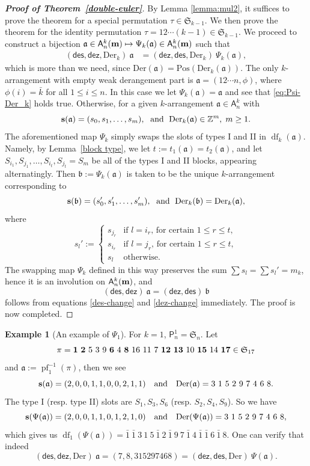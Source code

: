 \documentclass[12pt]{amsart}
\numberwithin{equation}{section}
\theoremstyle{plain}
\theoremstyle{definition}
\newtheorem{example}[theorem]{Example}
\newcommand{\Z}{\mathbb{Z}}
\newcommand\A{\mathsf{A}}
\renewcommand\P{\mathsf{P}}
\def\dez{\mathsf{dez}}
\def\Der{\mathrm{Der}}
\def\Pos{\mathrm{Pos}}
\def\des{\mathsf{des}}
\def\S{\mathfrak{S}}
\def\a{\mathfrak{a}}
\def\b{\mathfrak{b}}
\def\s{\operatorname{{\bf s}}}
\def\df{\operatorname{df}}
\def\pf{\operatorname{pf}}
\def\s{\operatorname{{\bf s}}}
\def\neg#1{{{{\bar#1}}}}
\begin{document}
\begin{proof}[\bf Proof of Theorem~\ref{double-euler}]
By Lemma \ref{lemma:mul2}, it suffices to prove the theorem for a special permutation $\tau\in\S_{k-1}$. We then prove the theorem for the identity permutation $\tau=12\cdots (k-1)\in \S_{k-1}$. We proceed to construct a bijection $\a\in\A_n^k({\bf m})\mapsto \Psi_k(\a)\in\A_n^k({\bf m})$ such that
\begin{align}\label{eq:Psi-Der_k}
(\des,\dez,\Der_k)~\a &= (\dez,\des,\Der_k)~\Psi_k(\a),
\end{align}
which is more than we need, since $\Der(\a)=\Pos(\Der_k(\a))$.
The only $k$-arrangement with empty weak derangement part is $\a=(12\cdots n,\phi)$, where $\phi(i)=\neg k$ for all $1\le i\le n$. In this case we let $\Psi_k(\a)=\a$ and see that \eqref{eq:Psi-Der_k} holds true. Otherwise, for a given $k$-arrangement $\a\in\A_n^k$ with
$$\s(\a)=(s_0,s_1,\ldots,s_m), \; \text{ and }\; \Der_k(\a)\in\Z^m, \; m\ge 1.$$
The aforementioned map $\Psi_k$ simply swaps the slots of types I and II in $\df_k(\a)$. Namely, by Lemma~\ref{block type}, we let $t:=t_1(\a)=t_2(\a)$, and let $S_{i_1},S_{j_1},\ldots,S_{i_t},S_{j_t}=S_m$ be all of the types I and II blocks, appearing alternatingly. Then $\b:=\Psi_k(\a)$ is taken to be the unique $k$-arrangement corresponding to
$$\s(\b)=(s_0',s_1',\ldots,s_m'),\; \text{ and }\; \Der_k(\b)=\Der_k(\a),$$
where
$$s_l':=\begin{cases}
s_{j_r} & \text{if $l=i_r$, for certain $1\le r\le t$},\\
s_{i_r} & \text{if $l=j_r$, for certain $1\le r\le t$},\\
s_l & \text{otherwise.}
\end{cases}$$
The swapping map $\Psi_k$ defined in this way preserves the sum $\sum s_l=\sum s_l'=m_k$, hence it is an involution on $\A_n^k({\bf m})$, and $$(\des,\dez)~\a = (\dez,\des)~\mathfrak{b}$$ follows from equations \eqref{des-change} and \eqref{dez-change} immediately. The proof is now completed.
\end{proof}

\begin{example}[An example of $\Psi_1$]
For $k=1$, $\P_n^1=\S_n$. Let 
$$\pi={\bf 1~2}~5~3~9~{\bf6}~4~{\bf 8}~16~11~7~{\bf 12~13}~10~{\bf15}~14~{\bf 17}\in\S_{17}$$ and $\a:=\pf_1^{-1}(\pi)$, then we see
$$\s(\a)=(2,0,0,1,1,0,0,2,1,1)\quad \text{and} \quad \Der(\a)=3~1~5~2~9~7~4~6~8. $$
The type I (resp. type II) slots are $S_1, S_3, S_6$ (resp. $S_2, S_4, S_9$). So we have
$$\s(\Psi(\a))=(2,0,0,1,1,0,1,2,1,0)\quad \text{and} \quad\Der(\Psi(\a))=3~1~5~2~9~7~4~6~8, $$
which gives us $\df_1(\Psi(\a))=\neg 1~\neg 1~3~1~5~\neg 1~2~\neg 1~9~7~\neg 1~4~\neg 1~\neg 1~6~\neg 1~8$. One can verify that indeed
$$(\des, \dez, \Der)~\a = (7, 8, 315297468) = (\dez, \des, \Der)~\Psi(\a).$$
\end{example}
\end{document}

